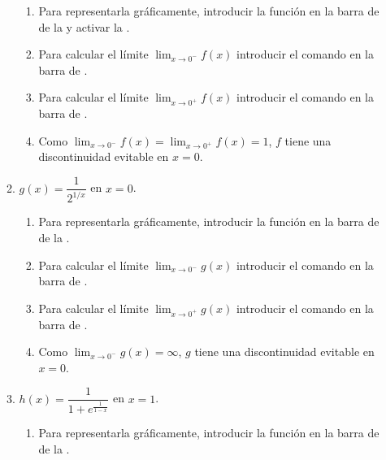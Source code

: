 \begin{enumerate}[leftmargin=*]
\begin{enumerate}
            \begin{indication}
            \begin{enumerate}
            \item Para representarla gráficamente, introducir la función  en la barra de  de la  y activar la .
            \item Para calcular el límite $\lim_{x\rightarrow 0^-}f(x)$ introducir el comando  en la barra de .
            \item Para calcular el límite $\lim_{x\rightarrow 0^+}f(x)$ introducir el comando  en la barra de .
            \item Como $\lim_{x\rightarrow 0^-}f(x)=\lim_{x\rightarrow 0^+}f(x)=1$, $f$ tiene una discontinuidad evitable en $x=0$.
            \end{enumerate}
            \end{indication}
      \item $g(x)=\dfrac{1}{2^{1/x}}$ en $x=0$.
            \begin{indication}
            \begin{enumerate}
            \item Para representarla gráficamente, introducir la función  en la barra de  de la .
            \item Para calcular el límite $\lim_{x\rightarrow 0^-}g(x)$ introducir el comando  en la barra de .
            \item Para calcular el límite $\lim_{x\rightarrow 0^+}g(x)$ introducir el comando  en la barra de .
            \item Como $\lim_{x\rightarrow 0^-}g(x)=\infty$, $g$ tiene una discontinuidad evitable en $x=0$.
            \end{enumerate}
            \end{indication}
      \item $h(x)=\dfrac{1}{1+e^{\frac{1}{1-x}}}$ en $x=1$.
            \begin{indication}
            \begin{enumerate}
            \item Para representarla gráficamente, introducir la función  en la barra de  de la .

\end{enumerate}
\end{indication}
\end{enumerate}
\end{enumerate}

